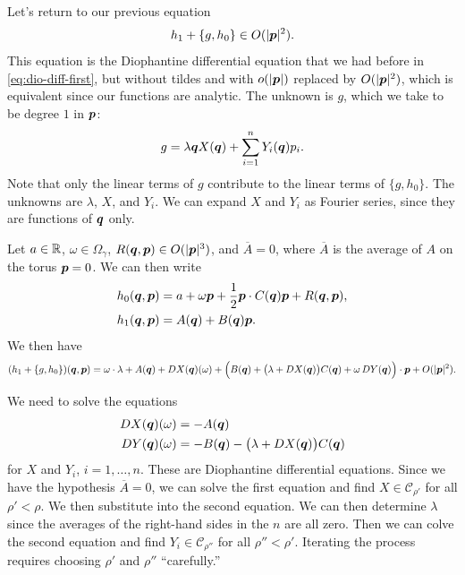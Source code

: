 \documentclass[twoside,letterpaper,10pt]{article}
\numberwithin{equation}{section}
\begin{document}
Let's return to our previous equation
\begin{equation*}
  h_1 + \{g, h_0\} \in O(|\bm{p}|^2).
\end{equation*}
This equation is the Diophantine differential equation that we had before in
\cref{eq:dio-diff-first}, but without tildes and with $o(|\bm{p}|)$ replaced by
$O(|\bm{p}|^2)$, which is equivalent since our functions are analytic.
The unknown is $g$, which we take to be degree $1$ in $\bm{p}$:
\begin{equation*}
  g = \lambda \bm{q} X(\bm{q}) + \sum_{i=1}^n Y_i(\bm{q}) p_i.
\end{equation*}
Note that only the linear terms of $g$ contribute to the linear terms of $\{g,
h_0\}$.
The unknowns are $\lambda$, $X$, and $Y_i$.
We can expand $X$ and $Y_i$ as Fourier series, since they are functions of
$\bm{q}$ only.

Let $a \in \mathbb{R}$, $\omega \in \Omega_{\gamma}$, $R(\bm{q}, \bm{p}) \in
O(|\bm{p}|^3)$, and $\overline{A} = 0$, where $\overline{A}$ is the average of
$A$ on the torus $\bm{p} = 0$.
We can then write
\begin{align*}
  h_0(\bm{q}, \bm{p}) &= a + \omega \bm{p} + \frac{1}{2} \bm{p} \cdot C(\bm{q})
                        \bm{p} + R(\bm{q}, \bm{p}),\\
  h_1(\bm{q}, \bm{p}) &= A(\bm{q}) + B(\bm{q}) \bm{p}.
\end{align*}
We then have
\begin{equation*}
  (h_1 + \{g, h_0\}) (\bm{q}, \bm{p}) = \omega \cdot \lambda + A(\bm{q}) + \mathop{}\!D
  X(\bm{q}) (\omega) + \Big( B(\bm{q}) + \big(\lambda + \mathop{}\!D X(\bm{q}) \big)
  C(\bm{q}) + \omega \mathop{}\!D Y(\bm{q}) \Big) \cdot \bm{p} + O(|\bm{p}|^2).
\end{equation*}

We need to solve the equations
\begin{align*}
  \mathop{}\!D X(\bm{q}) (\omega) &= - A(\bm{q})\\
  \mathop{}\!D Y(\bm{q}) (\omega) &= -B(\bm{q}) - \big(\lambda + \mathop{}\!D
     X(\bm{q})\big)C(\bm{q})
\end{align*}
for $X$ and $Y_i$, $i = 1, \ldots, n$.
These are Diophantine differential equations.
Since we have the hypothesis $\overline{A} = 0$, we can solve the first equation
and find $X \in \mathcal{C}_{\rho'}$ for all $\rho' < \rho$.
We then substitute into the second equation.
We can then determine $\lambda$ since the averages of the right-hand sides in
the $n$ are all zero.
Then we can colve the second equation and find $Y_i \in \mathcal{C}_{\rho''}$
for all $\rho'' < \rho'$.
Iterating the process requires choosing $\rho'$ and $\rho''$ ``carefully.''
\end{document}
